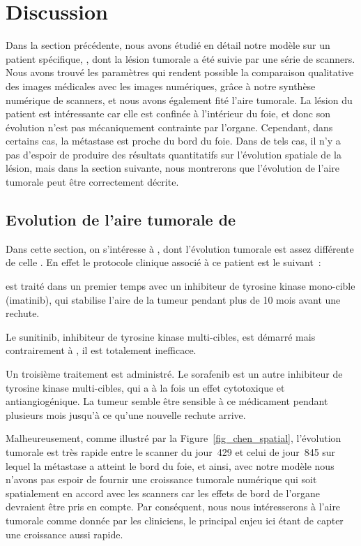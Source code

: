 \documentclass[main.tex]{subfiles}
\begin{document}
\section{Discussion}
Dans la section précédente, nous avons étudié en détail notre modèle sur un patient spécifique, \Nber, dont la lésion tumorale a été suivie par une série de scanners. Nous avons trouvé les paramètres qui rendent possible la comparaison qualitative des images médicales avec les images numériques, grâce à notre synthèse numérique de scanners, et nous avons également fité l'aire tumorale. La lésion du patient est intéressante car elle est confinée à l'intérieur du foie, et donc son évolution n'est pas mécaniquement contrainte par l'organe. 
Cependant, dans certains cas, la métastase est proche du bord du foie. Dans de tels cas, il n'y a pas d'espoir de produire des résultats quantitatifs sur l'évolution spatiale de la lésion, mais dans la section suivante, nous montrerons que l'évolution de l'aire tumorale peut être correctement décrite.
\subsection{Evolution de l'aire tumorale de \Chen}\label{section chen}
Dans cette section, on s'intéresse à \Chen, dont l'évolution tumorale est assez différente de celle \Nber. En effet le protocole clinique associé à ce patient est le suivant~:
\begin{myenumerate}[label=\roman*)]
\item \Chen est traité dans un premier temps avec un inhibiteur de tyrosine kinase mono-cible (imatinib), qui stabilise l'aire de la tumeur pendant plus de 10 mois avant une rechute. 
\item Le sunitinib, inhibiteur de tyrosine kinase multi-cibles, est démarré mais contrairement à \Nber, il est totalement inefficace. 
\item Un troisième traitement est administré. Le sorafenib est un autre inhibiteur de tyrosine kinase multi-cibles, qui a à la fois un effet cytotoxique et antiangiogénique. La tumeur semble être sensible à ce médicament pendant plusieurs mois jusqu'à ce qu'une nouvelle rechute arrive. 
\end{myenumerate}
Malheureusement, comme illustré par la Figure~\ref{fig_chen_spatial}, l'évolution tumorale est très rapide entre le scanner du jour~429 et celui de jour~845 sur lequel la métastase a atteint le bord du foie, et ainsi, avec notre modèle nous n'avons pas espoir de fournir une croissance tumorale numérique qui soit spatialement en accord avec les scanners car les effets de bord de l'organe devraient être pris en compte. Par conséquent, nous nous intéresserons à  l'aire tumorale comme donnée par les cliniciens, le principal enjeu ici étant de capter une croissance aussi rapide. 
\end{document}
